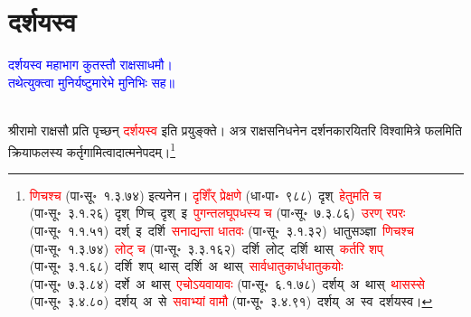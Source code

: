 \section[दर्शयस्व]{दर्शयस्व}
\centering\textcolor{blue}{दर्शयस्व महाभाग कुतस्तौ राक्षसाधमौ।\nopagebreak\\
तथेत्युक्त्वा मुनिर्यष्टुमारेभे मुनिभिः सह॥}\nopagebreak\\
\\
\fontsize{14}{21}\selectfont\begin{sloppypar}\justifying\noindent\hspace{10mm} श्रीरामो राक्षसौ प्रति पृच्छन् \textcolor{red}{दर्शयस्व} इति प्रयुङ्क्ते। अत्र राक्षस\-निधनेन दर्शन\-कारयितरि विश्वामित्रे फलमिति क्रिया\-फलस्य कर्तृ\-गामित्वादात्मने\-पदम्।\footnote{\textcolor{red}{णिचश्च} (पा॰सू॰~१.३.७४) इत्यनेन। \textcolor{red}{दृशिँर् प्रेक्षणे} (धा॰पा॰~९८८)~\arrow दृश्~\arrow \textcolor{red}{हेतुमति च} (पा॰सू॰~३.१.२६)~\arrow दृश्~णिच्~\arrow दृश्~इ~\arrow \textcolor{red}{पुगन्त\-लघूपधस्य च} (पा॰सू॰~७.३.८६)~\arrow \textcolor{red}{उरण् रपरः} (पा॰सू॰~१.१.५१)~\arrow दर्श्~इ~\arrow दर्शि~\arrow \textcolor{red}{सनाद्यन्ता धातवः} (पा॰सू॰~३.१.३२)~\arrow धातुसञ्ज्ञा~\arrow \textcolor{red}{णिचश्च} (पा॰सू॰~१.३.७४)~\arrow \textcolor{red}{लोट् च} (पा॰सू॰~३.३.१६२)~\arrow दर्शि~लोट्~\arrow दर्शि~थास्~\arrow \textcolor{red}{कर्तरि शप्} (पा॰सू॰~३.१.६८)~\arrow दर्शि~शप्~थास्~\arrow दर्शि~अ~थास्~\arrow \textcolor{red}{सार्वधातुकार्धधातुकयोः} (पा॰सू॰~७.३.८४)~\arrow दर्शे~अ~थास्~\arrow \textcolor{red}{एचोऽयवायावः} (पा॰सू॰~६.१.७८)~\arrow दर्शय्~अ~थास्~\arrow \textcolor{red}{थासस्से} (पा॰सू॰~३.४.८०)~\arrow दर्शय्~अ~से~\arrow \textcolor{red}{सवाभ्यां वामौ} (पा॰सू॰~३.४.९१)~\arrow दर्शय्~अ~स्व~\arrow दर्शयस्व।}\end{sloppypar}
